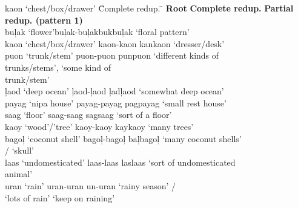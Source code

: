 \ea 
\label{ex:pattern}
\begin{tabbing}
kaon ‘chest/box/drawer’ \hspace{.1cm} \= Complete redup. \hspace{.1cm} \= \kill
\textbf{Root}  \>    \textbf{Complete redup.} \> \textbf{Partial redup. (pattern 1)} \\
buļak ‘flower'\>buļak-buļak\>bukbuļak ‘floral pattern’ \\
kaon ‘chest/box/drawer’ \> kaon-kaon  \>    kankaon ‘dresser/desk’ \\
puon ‘trunk/stem’ \> puon-puon  \>    punpuon ‘different kinds of \\
 \> \> trunks/stems’, `some kind of \\
 \> \>                trunk/stem’ \\
ļaod ‘deep ocean’ \>  ļaod-ļaod \>      ļadļaod ‘somewhat deep ocean’ \\
payag ‘nipa house’ \> payag-payag  \>   pagpayag ‘small rest house’ \\
saag ‘floor’  \>  saag-saag   \>   sagsaag ‘sort of a floor’ \\
kaoy ‘wood’/’tree’ \> kaoy-kaoy \>     kaykaoy ‘many trees’ \\
bagoļ ‘coconut shell’ \>  bagoļ-bagoļ  \>    baļbagoļ ‘many coconut shells’ \\ \> \> / ‘skull’ \\
laas ‘undomesticated' \>  laas-laas \>        laslaas ‘sort of undomesticated \\
 \> \>                 animal’ \\
uran ‘rain’  \>  uran-uran \> un-uran  ‘rainy season’ / \\
 \> ‘lots of rain' \> `keep on raining’ \\
\end{tabbing}
\z
\ea 
\label{ex:boat}
